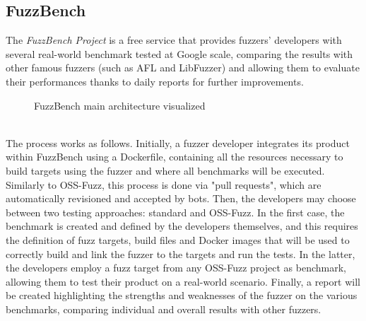\documentclass[Lau,oneside]{sapthesis}%
\begin{document}
\subsection{FuzzBench}
The \textit{FuzzBench Project} is a free service that provides fuzzers' developers with several real-world benchmark tested at Google scale, comparing the results with other famous fuzzers (such as AFL and LibFuzzer) and allowing them to evaluate their performances thanks to daily reports for further improvements.
\cite{ref:fuzzbench_docs}
\newline
\begin{figure}[h]
\caption{FuzzBench main architecture visualized \cite{ref:fuzzbench_docs}}
\label{fig:fuzzbench_architecture}
\end{figure}
\ \\
The process works as follows.
\newline \newline
Initially, a fuzzer developer integrates its product within FuzzBench using a Dockerfile, containing all the resources necessary to build targets using the fuzzer and where all benchmarks will be executed.
\newline
Similarly to OSS-Fuzz, this process is done via "pull requests", which are automatically revisioned and accepted by bots.
\newline \newline
Then, the developers may choose between two testing approaches: standard and OSS-Fuzz.
\newline
In the first case, the benchmark is created and defined by the developers themselves, and this requires the definition of fuzz targets, build files and Docker images that will be used to correctly build and link the fuzzer to the targets and run the tests.
\newline
In the latter, the developers employ a fuzz target from any OSS-Fuzz project as benchmark, allowing them to test their product on a real-world scenario.
\newline \newline
Finally, a report will be created highlighting the strengths and weaknesses of the fuzzer on the various benchmarks, comparing individual and overall results with other fuzzers.
\end{document}
